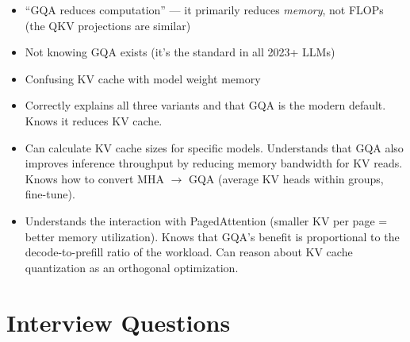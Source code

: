 \begin{interviewq}
\redflags
\begin{itemize}
    \item ``GQA reduces computation'' --- it primarily reduces \textit{memory}, not FLOPs (the QKV projections are similar)
    \item Not knowing GQA exists (it's the standard in all 2023+ LLMs)
    \item Confusing KV cache with model weight memory
\end{itemize}


\goodgreat
\begin{itemize}
    \item {} Correctly explains all three variants and that GQA is the modern default. Knows it reduces KV cache.
    \item {} Can calculate KV cache sizes for specific models. Understands that GQA also improves inference throughput by reducing memory bandwidth for KV reads. Knows how to convert MHA $\to$ GQA (average KV heads within groups, fine-tune).
    \item {} Understands the interaction with PagedAttention (smaller KV per page = better memory utilization). Knows that GQA's benefit is proportional to the decode-to-prefill ratio of the workload. Can reason about KV cache quantization as an orthogonal optimization.
\end{itemize}

\end{interviewq}

\section{Interview Questions}
\label{sec:attention_interview}

